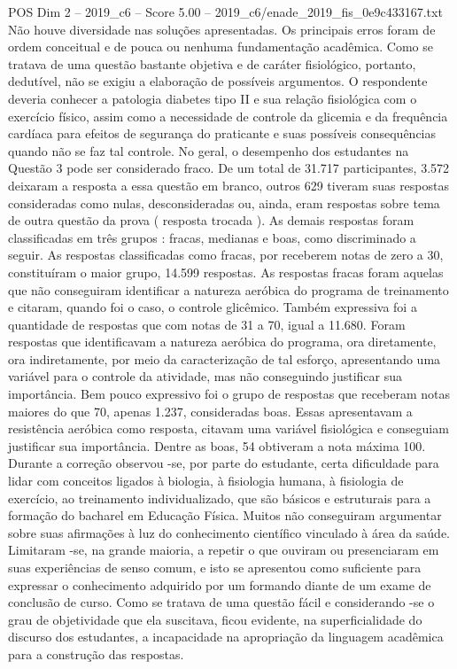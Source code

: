 \begin{textsample}{POS Dim 2 – 2019\_c6 – Score 5.00 – 2019\_c6/enade\_2019\_fis\_0e9c433167.txt}
Não houve diversidade nas soluções apresentadas.
Os principais erros foram de ordem conceitual e de pouca ou nenhuma fundamentação acadêmica.
Como se tratava de uma questão bastante objetiva e de caráter fisiológico, portanto, dedutível, não se exigiu a elaboração de possíveis argumentos.
O respondente deveria conhecer a patologia diabetes tipo II e sua relação fisiológica com o exercício físico, assim como a necessidade de controle da glicemia e da frequência cardíaca para efeitos de segurança do praticante e suas possíveis consequências quando não se faz tal controle.
No geral, o desempenho dos estudantes na Questão 3 pode ser considerado fraco.
De um total de 31.717 participantes, 3.572 deixaram a resposta a essa questão em branco, outros 629 tiveram suas respostas consideradas como nulas, desconsideradas ou, ainda, eram respostas sobre tema de outra questão da prova ( resposta trocada ).
As demais respostas foram classificadas em três grupos : fracas, medianas e boas, como discriminado a seguir.
As respostas classificadas como fracas, por receberem notas de zero a 30, constituíram o maior grupo, 14.599 respostas.
As respostas fracas foram aquelas que não conseguiram identificar a natureza aeróbica do programa de treinamento e citaram, quando foi o caso, o controle glicêmico.
Também expressiva foi a quantidade de respostas que com notas de 31 a 70, igual a 11.680.
Foram respostas que identificavam a natureza aeróbica do programa, ora diretamente, ora indiretamente, por meio da caracterização de tal esforço, apresentando uma variável para o controle da atividade, mas não conseguindo justificar sua importância.
Bem pouco expressivo foi o grupo de respostas que receberam notas maiores do que 70, apenas 1.237, consideradas boas.
Essas apresentavam a resistência aeróbica como resposta, citavam uma variável fisiológica e conseguiam justificar sua importância.
Dentre as boas, 54 obtiveram a nota máxima 100.
Durante a correção observou -se, por parte do estudante, certa dificuldade para lidar com conceitos ligados à biologia, à fisiologia humana, à fisiologia de exercício, ao treinamento individualizado, que são básicos e estruturais para a formação do bacharel em Educação Física.
Muitos não conseguiram argumentar sobre suas afirmações à luz do conhecimento científico vinculado à área da saúde.
Limitaram -se, na grande maioria, a repetir o que ouviram ou presenciaram em suas experiências de senso comum, e isto se apresentou como suficiente para expressar o conhecimento adquirido por um formando diante de um exame de conclusão de curso.
Como se tratava de uma questão fácil e considerando -se o grau de objetividade que ela suscitava, ficou evidente, na superficialidade do discurso dos estudantes, a incapacidade na apropriação da linguagem acadêmica para a construção das respostas.

\end{textsample}
